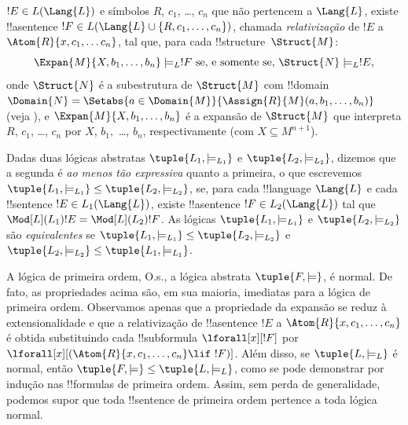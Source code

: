 \documentclass[../../../include/open-logic-section]{subfiles}
\begin{document}
\begin{defn}
\begin{enumerate}
  $!E \in L(\Lang{L})$ e símbolos $R$, $c_1$, \dots, $c_n$ que não
  pertencem a $\Lang{L}$, existe !!a{sentence}
  $!F \in L(\Lang{L} \cup \{R,c_1,\ldots,c_n\})$, chamada
  \emph{relativização} de $!E$ a $\Atom{R}{x, c_1, \dots c_n}$, tal
  que, para cada !!{structure}~$\Struct{M}$:
  \[
  \Expan{M}{X, b_1, \ldots, b_n} \models_L !F \text{ se, e
    somente se, } \Struct{N} \models_L !E,
  \]
  onde $\Struct{N}$ é a subestrutura de $\Struct{M}$ com !!{domain}
  $\Domain{N} = \Setabs{a\in \Domain{M}}{\Assign{R}{M}(a, b_1, \dots, b_n)}$
  (veja ), e
  $\Expan{M}{X, b_1, \ldots, b_n}$ é a expansão de $\Struct{M}$ que
  interpreta $R$, $c_1$, \dots, $c_n$ por $X$, $b_1,$ \dots, $b_n$,
  respectivamente (com $X \subseteq M^{n+1}$).
\end{enumerate}
\end{defn}
 
\begin{defn}
Dadas duas lógicas abstratas $\tuple{L_1, \models_{L_1}}$ e
$\tuple{L_2, \models_{L_2}}$, dizemos que a segunda é \emph{ao menos
  tão expressiva} quanto a primeira, o que escrevemos
$\tuple{L_1, \models_{L_1}} \leq \tuple{L_2, \models_{L_2}}$, se, para
cada !!{language} $\Lang{L}$ e cada !!{sentence}
$!E \in L_1(\Lang{L})$, existe !!a{sentence}
$!F \in L_2(\Lang{L})$ tal que
$\Mod[L](L_1){!E} = \Mod[L](L_2){!F}$. As lógicas
$\tuple{L_1, \models_{L_1}}$ e $\tuple{L_2, \models_{L_2}}$ são
\emph{equivalentes} se
$\tuple{L_1, \models_{L_1}} \leq \tuple{L_2, \models_{L_2}}$ e
$\tuple{L_2, \models_{L_2}} \leq \tuple{L_1, \models_{L_1}}$.
\end{defn}

\begin{rem}
  A lógica de primeira ordem, O.s.\@, a lógica abstrata
  $\tuple{F, \models}$, é normal. De fato, as propriedades acima são,
  em sua maioria, imediatas para a lógica de primeira ordem. Observamos
  apenas que a propriedade da expansão se reduz à extensionalidade e
  que a relativização de !!a{sentence} $!E$ a
  $\Atom{R}{x, c_1, \dots, c_n}$ é obtida substituindo cada
  !!{subformula} $\lforall[x][!F]$ por
  $\lforall[x][(\Atom{R}{x, c_1, \dots, c_n} \lif \ !F)]$. Além disso,
  se $\tuple{L, \models_L}$ é normal, então
  $\tuple{F, \models} \leq \tuple{L, \models_{L}}$, como se pode
  demonstrar por indução nas !!{formula}s de primeira ordem. Assim, sem
  perda de generalidade, podemos supor que toda !!{sentence} de
  primeira ordem pertence a toda lógica normal.
\end{rem}
\end{document}
